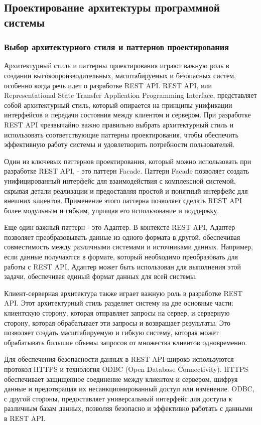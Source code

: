 \subsection{Проектирование архитектуры программной системы}

\subsubsection{Выбор архитектурного стиля и паттернов проектирования}

Архитектурный стиль и паттерны проектирования играют важную роль в создании высокопроизводительных, масштабируемых и безопасных систем, особенно когда речь идет о разработке REST API. REST API, или Representational State Transfer Application Programming Interface, представляет собой архитектурный стиль, который опирается на принципы унификации интерфейсов и передачи состояния между клиентом и сервером. При разработке REST API чрезвычайно важно правильно выбрать архитектурный стиль и использовать соответствующие паттерны проектирования, чтобы обеспечить эффективную работу системы и удовлетворить потребности пользователей.

Один из ключевых паттернов проектирования, который можно использовать при разработке REST API, - это паттерн Facade. Паттерн Facade позволяет создать унифицированный интерфейс для взаимодействия с комплексной системой, скрывая детали реализации и предоставляя простой и понятный интерфейс для внешних клиентов. Применение этого паттерна позволяет сделать REST API более модульным и гибким, упрощая его использование и поддержку.

Еще один важный паттерн - это Адаптер. В контексте REST API, Адаптер позволяет преобразовывать данные из одного формата в другой, обеспечивая совместимость между различными системами и источниками данных. Например, если данные получаются в формате, который необходимо преобразовать для работы с REST API, Адаптер может быть использован для выполнения этой задачи, обеспечивая единый формат данных для всей системы.

Клиент-серверная архитектура также играет важную роль в разработке REST API. Этот архитектурный стиль разделяет систему на две основные части: клиентскую сторону, которая отправляет запросы на сервер, и серверную сторону, которая обрабатывает эти запросы и возвращает результаты. Это позволяет создать масштабируемую и гибкую систему, которая может обрабатывать большие объемы запросов от множества клиентов одновременно.

Для обеспечения безопасности данных в REST API широко используются протокол HTTPS и технология ODBC (Open Database Connectivity). HTTPS обеспечивает защищенное соединение между клиентом и сервером, шифруя данные и предотвращая их несанкционированный доступ или изменение. ODBC, с другой стороны, предоставляет универсальный интерфейс для доступа к различным базам данных, позволяя безопасно и эффективно работать с данными в REST API.


